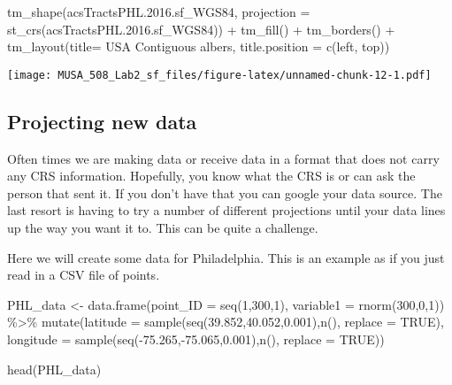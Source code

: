 \documentclass[
]{article}
\newenvironment{Shaded}{\begin{snugshade}}{\end{snugshade}}
\newcommand{\AttributeTok}[1]{\textcolor[rgb]{0.77,0.63,0.00}{#1}}
\newcommand{\ConstantTok}[1]{\textcolor[rgb]{0.00,0.00,0.00}{#1}}
\newcommand{\DecValTok}[1]{\textcolor[rgb]{0.00,0.00,0.81}{#1}}
\newcommand{\FloatTok}[1]{\textcolor[rgb]{0.00,0.00,0.81}{#1}}
\newcommand{\FunctionTok}[1]{\textcolor[rgb]{0.00,0.00,0.00}{#1}}
\newcommand{\NormalTok}[1]{#1}
\newcommand{\OtherTok}[1]{\textcolor[rgb]{0.56,0.35,0.01}{#1}}
\newcommand{\SpecialCharTok}[1]{\textcolor[rgb]{0.00,0.00,0.00}{#1}}
\newcommand{\StringTok}[1]{\textcolor[rgb]{0.31,0.60,0.02}{#1}}
\begin{document}
\begin{Shaded}
\begin{Highlighting}[]
\FunctionTok{tm\_shape}\NormalTok{(acsTractsPHL.}\FloatTok{2016.}\NormalTok{sf\_WGS84, }
         \AttributeTok{projection =} \FunctionTok{st\_crs}\NormalTok{(acsTractsPHL.}\FloatTok{2016.}\NormalTok{sf\_WGS84)) }\SpecialCharTok{+}
  \FunctionTok{tm\_fill}\NormalTok{() }\SpecialCharTok{+}
  \FunctionTok{tm\_borders}\NormalTok{() }\SpecialCharTok{+}
  \FunctionTok{tm\_layout}\NormalTok{(}\AttributeTok{title=} \StringTok{\textquotesingle{}USA Contiguous albers\textquotesingle{}}\NormalTok{, }
            \AttributeTok{title.position =} \FunctionTok{c}\NormalTok{(}\StringTok{\textquotesingle{}left\textquotesingle{}}\NormalTok{, }\StringTok{\textquotesingle{}top\textquotesingle{}}\NormalTok{))}
\end{Highlighting}
\end{Shaded}

\texttt{[image: MUSA\_508\_Lab2\_sf\_files/figure-latex/unnamed-chunk-12-1.pdf]}

\hypertarget{projecting-new-data}{%
\subsection{Projecting new data}\label{projecting-new-data}}

Often times we are making data or receive data in a format that does not
carry any CRS information. Hopefully, you know what the CRS is or can
ask the person that sent it. If you don't have that you can google your
data source. The last resort is having to try a number of different
projections until your data lines up the way you want it to. This can be
quite a challenge.

Here we will create some data for Philadelphia. This is an example as if
you just read in a CSV file of points.

\begin{Shaded}
\begin{Highlighting}[]
\NormalTok{PHL\_data }\OtherTok{\textless{}{-}} \FunctionTok{data.frame}\NormalTok{(}\AttributeTok{point\_ID =} \FunctionTok{seq}\NormalTok{(}\DecValTok{1}\NormalTok{,}\DecValTok{300}\NormalTok{,}\DecValTok{1}\NormalTok{),}
                       \AttributeTok{variable1 =} \FunctionTok{rnorm}\NormalTok{(}\DecValTok{300}\NormalTok{,}\DecValTok{0}\NormalTok{,}\DecValTok{1}\NormalTok{)) }\SpecialCharTok{\%\textgreater{}\%} 
            \FunctionTok{mutate}\NormalTok{(}\AttributeTok{latitude  =} \FunctionTok{sample}\NormalTok{(}\FunctionTok{seq}\NormalTok{(}\FloatTok{39.852}\NormalTok{,}\FloatTok{40.052}\NormalTok{,}\FloatTok{0.001}\NormalTok{),}\FunctionTok{n}\NormalTok{(), }\AttributeTok{replace =} \ConstantTok{TRUE}\NormalTok{),}
                   \AttributeTok{longitude =} \FunctionTok{sample}\NormalTok{(}\FunctionTok{seq}\NormalTok{(}\SpecialCharTok{{-}}\FloatTok{75.265}\NormalTok{,}\SpecialCharTok{{-}}\FloatTok{75.065}\NormalTok{,}\FloatTok{0.001}\NormalTok{),}\FunctionTok{n}\NormalTok{(), }\AttributeTok{replace =} \ConstantTok{TRUE}\NormalTok{))}

\FunctionTok{head}\NormalTok{(PHL\_data)}
\end{Highlighting}
\end{Shaded}
\end{document}
